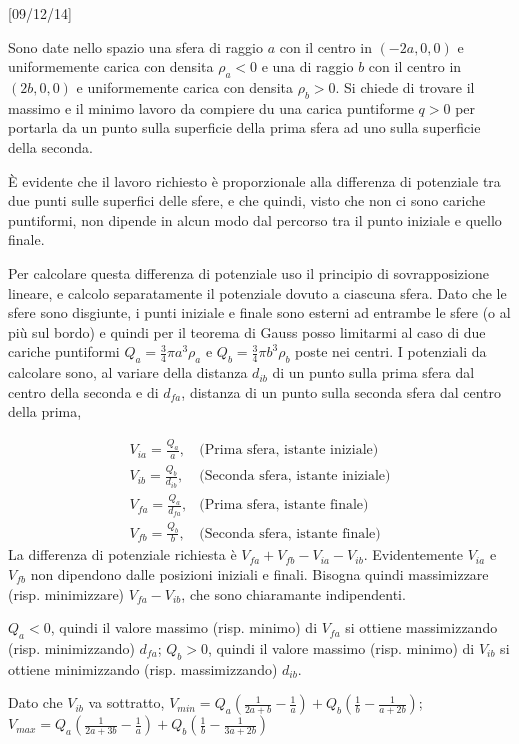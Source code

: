 \documentclass[../main.tex]{subfiles}
\begin{document}
[09/12/14] %

\textex
Sono date nello spazio una sfera di raggio $a$ con il centro in $(-2a,0,0)$ e uniformemente carica con densita $\rho_a<0$ e una di raggio $b$ con il centro in $(2b,0,0)$ e uniformemente carica con densita $\rho_b>0$. Si chiede di trovare il massimo e il minimo lavoro da compiere du una carica puntiforme $q>0$ per portarla da un punto sulla superficie della prima sfera ad uno sulla superficie della seconda.

\solution
\`E evidente che il lavoro richiesto \`e proporzionale alla differenza di potenziale tra due punti sulle superfici delle sfere, e che quindi, visto che non ci sono cariche puntiformi, non dipende in alcun modo dal percorso tra il punto iniziale e quello finale.

Per calcolare questa differenza di potenziale uso il principio di sovrapposizione lineare, e calcolo separatamente il potenziale dovuto a ciascuna sfera. Dato che le sfere sono disgiunte, i punti iniziale e finale sono esterni ad entrambe le sfere (o al pi\`u sul bordo) e quindi per il teorema di Gauss posso limitarmi al caso di due cariche puntiformi $Q_a=\frac{3}{4} \pi a^3 \rho_a $ e $Q_b=\frac{3}{4} \pi b^3 \rho_b $  poste nei centri.\newline
I potenziali da calcolare sono, al variare della distanza $d_{ib}$ di un punto sulla prima sfera dal centro della seconda e di $d_{fa}$, distanza di un punto sulla seconda sfera dal centro della prima,

\begin{subequations}
  \label{dsc:potenziali}
  \begin{align}
    V_{ia}=\frac{Q_a}{a},	& \text{(Prima sfera, istante iniziale)} \\
    V_{ib}=\frac{Q_b}{d_{ib}},	& \text{(Seconda sfera, istante iniziale)} \\
    V_{fa}=\frac{Q_a}{d_{fa}},	& \text{(Prima sfera, istante finale)} \\
    V_{fb}=\frac{Q_b}{b},	& \text{(Seconda sfera, istante finale)}
  \end{align}
\end{subequations}
La differenza di potenziale richiesta \`e $V_{fa}+V_{fb}-V_{ia}-V_{ib}$.
Evidentemente $V_{ia}$ e $V_{fb}$ non dipendono dalle posizioni iniziali e finali. Bisogna quindi massimizzare (risp. minimizzare) $V_{fa}-V_{ib}$, che sono chiaramante indipendenti.

$Q_a<0$, quindi il valore massimo (risp. minimo) di $V_{fa}$ si ottiene massimizzando (risp. minimizzando) $d_{fa}$; $Q_b>0$, quindi il valore massimo (risp. minimo) di $V_{ib}$ si ottiene minimizzando (risp. massimizzando) $d_{ib}$.

Dato che $V_{ib}$ va sottratto, $V_{min}=Q_a(\frac{1}{2a+b}- \frac{1}{a})+Q_b(\frac{1}{b}-\frac{1}{a+2b})$; $V_{max}=Q_a(\frac{1}{2a+3b}- \frac{1}{a})+Q_b(\frac{1}{b}-\frac{1}{3a+2b})$
\end{document}
